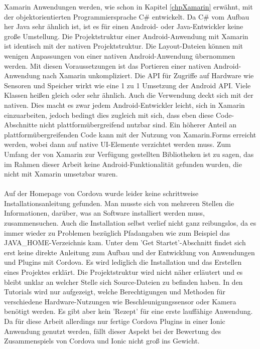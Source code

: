 Xamarin Anwendungen werden, wie schon in Kapitel \ref{chpXamarin} erwähnt, mit der objektorientierten Programmiersprache C\# entwickelt. Da C\# vom Aufbau her Java sehr ähnlich ist, ist es für einen Android- oder Java-Entwickler keine große Umstellung. Die Projektstruktur einer Android-Anwendung mit Xamarin ist identisch mit der nativen Projektstruktur. Die Layout-Dateien können mit wenigen Anpassungen von einer nativen Android-Anwendung übernommen werden. Mit diesen Voraussetzungen ist das Portieren einer nativen Android-Anwendung nach Xamarin unkompliziert. Die API für Zugriffe auf Hardware wie Sensoren und Speicher wirkt wie eine 1 zu 1 Umsetzung der Android API. Viele Klassen heißen gleich oder sehr ähnlich. Auch die Verwendung deckt sich mit der nativen. Dies macht es zwar jedem Android-Entwickler leicht, sich in Xamarin einzuarbeiten, jedoch bedingt dies zugleich mit sich, dass eben diese Code-Abschnitte nicht plattformübergreifend nutzbar sind. Ein höherer Anteil an plattformübergreifenden Code kann mit der Nutzung von Xamarin.Forms erreicht werden, wobei dann auf native UI-Elemente verzichtet werden muss. Zum Umfang der von Xamarin zur Verfügung gestellten Bibliotheken ist zu sagen, das im Rahmen dieser Arbeit keine Android-Funktionalität gefunden wurden, die nicht mit Xamarin umsetzbar waren. 
\\
\\
Auf der Homepage von Cordova wurde leider keine schrittweise Installationsanleitung gefunden. Man musste sich von mehreren Stellen die Informationen, darüber, was an Software installiert werden muss, zusammensuchen. Auch die Installation selbst verlief nicht ganz reibungslos, da es immer wieder zu Problemen bezüglich Pfadangaben wie zum Beispiel das JAVA\_HOME-Verzeichnis kam. Unter dem 'Get Startet'-Abschnitt findet sich erst keine direkte Anleitung zum Aufbau und der Entwicklung von Anwendungen und Plugins mit Cordova. Es wird lediglich die Installation und das Erstellen eines Projektes erklärt. Die Projektstruktur wird nicht näher erläutert und es bleibt unklar an welcher Stelle sich Source-Dateien zu befinden haben. In den Tutorials wird nur aufgezeigt, welche Berechtigungen und Methoden für verschiedene Hardware-Nutzungen wie Beschleunigungssensor oder Kamera benötigt werden. Es gibt aber kein 'Rezept' für eine erste lauffähige Anwendung. Da für diese Arbeit allerdings nur fertige Cordova Plugins in einer Ionic Anwendung genutzt werden, fällt dieser Aspekt bei der Bewertung des Zusammenspiels von Cordova und Ionic nicht groß ins Gewicht. 
\\
